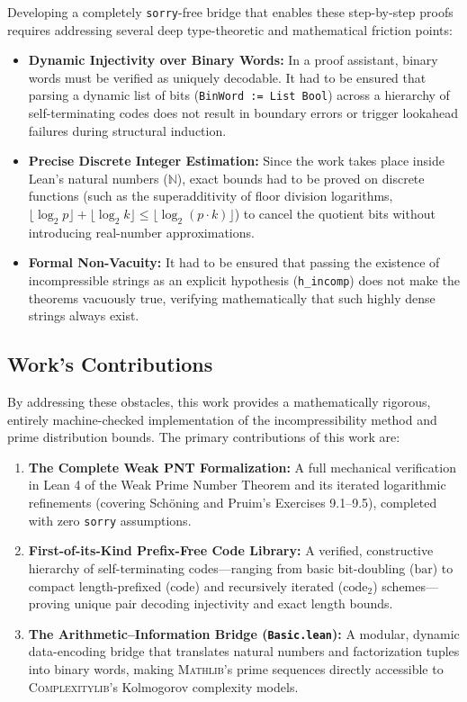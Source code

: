 \documentclass[acmsmall,natbib=false,nonacm]{acmart}
\begin{document}
Developing a completely \texttt{sorry}-free bridge that enables these step-by-step proofs requires addressing several deep type-theoretic and mathematical friction points:
\begin{itemize}
    \item \textbf{Dynamic Injectivity over Binary Words:} In a proof assistant, binary words must be verified as uniquely decodable. It had to be ensured that parsing a dynamic list of bits (\texttt{BinWord := List Bool}) across a hierarchy of self-terminating codes does not result in boundary errors or trigger lookahead failures during structural induction.
    \item \textbf{Precise Discrete Integer Estimation:} Since the work takes place inside Lean's natural numbers ($\mathbb{N}$), exact bounds had to be proved on discrete functions (such as the superadditivity of floor division logarithms, $\lfloor\log_2 p\rfloor + \lfloor\log_2 k\rfloor \le \lfloor\log_2 (p \cdot k)\rfloor$) to cancel the quotient bits without introducing real-number approximations.
    \item \textbf{Formal Non-Vacuity:} It had to be ensured that passing the existence of incompressible strings as an explicit hypothesis (\texttt{h\_incomp}) does not make the theorems vacuously true, verifying mathematically that such highly dense strings always exist.
\end{itemize}

\subsection{Work's Contributions}
By addressing these obstacles, this work provides a mathematically rigorous, entirely machine-checked implementation of the incompressibility method and prime distribution bounds. The primary contributions of this work are:
\begin{enumerate}
    \item \textbf{The Complete Weak PNT Formalization:} A full mechanical verification in Lean 4 of the Weak Prime Number Theorem and its iterated logarithmic refinements (covering Sch\"{o}ning and Pruim's Exercises 9.1--9.5), completed with zero \texttt{sorry} assumptions.
    \item \textbf{First-of-its-Kind Prefix-Free Code Library:} A verified, constructive hierarchy of self-terminating codes—ranging from basic bit-doubling ($\text{bar}$) to compact length-prefixed ($\text{code}$) and recursively iterated ($\text{code}_2$) schemes—proving unique pair decoding injectivity and exact length bounds.
    \item \textbf{The Arithmetic--Information Bridge (\texttt{Basic.lean}):} A modular, dynamic data-encoding bridge that translates natural numbers and factorization tuples into binary words, making \textsc{Mathlib}'s prime sequences directly accessible to \textsc{Complexitylib}'s Kolmogorov complexity models.
\end{enumerate}
\end{document}
